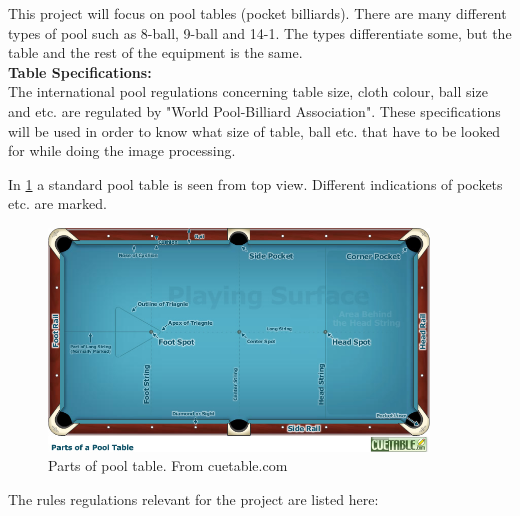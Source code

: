 This project will focus on pool tables (pocket billiards). There are many different types of pool such as 8-ball, 9-ball and 14-1. The types differentiate some, but the table and the rest of the equipment is the same.\\

\textbf{Table Specifications:}\\
The international pool regulations concerning table size, cloth colour, ball size and etc. are regulated by "World Pool-Billiard Association"\cite{poolregulations}. These specifications will be used in order to know what size of table, ball etc. that have to be looked for while doing the image processing.

In \ref{fig:partspool} a standard pool table is seen from top view. Different indications of pockets etc. are marked.

\begin{figure}[H]
\begin{center}
\leavevmode
\includegraphics[width=0.9\textwidth]{images/pooltablespecs.jpg}
\end{center}
\caption{Parts of pool table. From cuetable.com}
\label{fig:partspool}
\end{figure}

The rules regulations relevant for the project are listed here:

